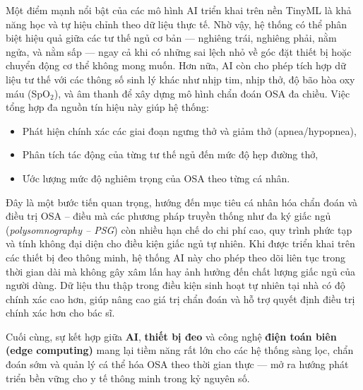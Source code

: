 Một điểm mạnh nổi bật của các mô hình AI triển khai trên nền TinyML là khả năng học và tự hiệu chỉnh theo dữ liệu thực tế. Nhờ vậy, hệ thống có thể phân biệt hiệu quả giữa các tư thế ngủ cơ bản — nghiêng trái, nghiêng phải, nằm ngửa, và nằm sấp — ngay cả khi có những sai lệch nhỏ về góc đặt thiết bị hoặc chuyển động cơ thể không mong muốn. 
Hơn nữa, AI còn cho phép tích hợp dữ liệu tư thế với các thông số sinh lý khác như nhịp tim, nhịp thở, độ bão hòa oxy máu (SpO$_2$), và âm thanh để xây dựng mô hình chẩn đoán OSA đa chiều. Việc tổng hợp đa nguồn tín hiệu này giúp hệ thống: 
\begin{itemize}
    \item Phát hiện chính xác các giai đoạn ngưng thở và giảm thở (apnea/hypopnea),
    \item Phân tích tác động của từng tư thế ngủ đến mức độ hẹp đường thở,
    \item Ước lượng mức độ nghiêm trọng của OSA theo từng cá nhân.
\end{itemize}
Đây là một bước tiến quan trọng, hướng đến mục tiêu cá nhân hóa chẩn đoán và điều trị OSA – điều mà các phương pháp truyền thống như đa ký giấc ngủ (\textit{polysomnography – PSG}) còn nhiều hạn chế do chi phí cao, quy trình phức tạp và tính không đại diện cho điều kiện giấc ngủ tự nhiên.
Khi được triển khai trên các thiết bị đeo thông minh, hệ thống AI này cho phép theo dõi liên tục trong thời gian dài mà không gây xâm lấn hay ảnh hưởng đến chất lượng giấc ngủ của người dùng. Dữ liệu thu thập trong điều kiện sinh hoạt tự nhiên tại nhà có độ chính xác cao hơn, giúp nâng cao giá trị chẩn đoán và hỗ trợ quyết định điều trị chính xác hơn cho bác sĩ.

Cuối cùng, sự kết hợp giữa \textbf{AI}, \textbf{thiết bị đeo} và công nghệ \textbf{điện toán biên (edge computing)} mang lại tiềm năng rất lớn cho các hệ thống sàng lọc, chẩn đoán sớm và quản lý cá thể hóa OSA theo thời gian thực — mở ra hướng phát triển bền vững cho y tế thông minh trong kỷ nguyên số.















